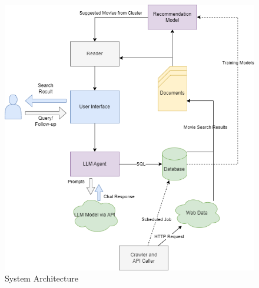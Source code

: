 \documentclass[journal]{IEEEtran}
\theoremstyle{mydefstyle}
\begin{document}
\begin{figure}
    \centering
    \includegraphics[width=1\linewidth]{doc//report//assets/sysarch_final.png}
    \caption{System Architecture}
    \label{fig:sysarch}
\end{figure}
\end{document}

